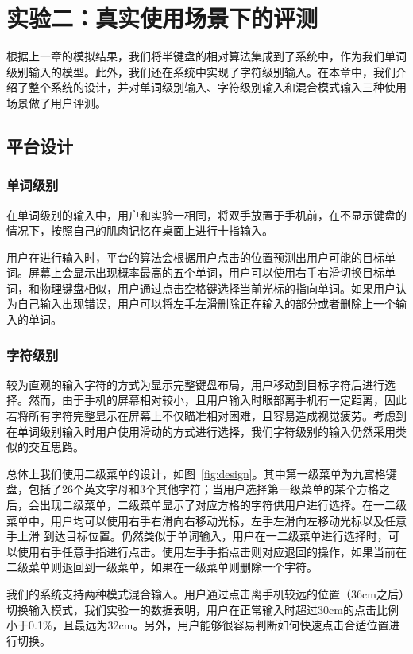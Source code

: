 \chapter{实验二：真实使用场景下的评测} %
\label{cha:evaluation}
根据上一章的模拟结果，我们将半键盘的相对算法集成到了系统中，作为我们单词级别输入的模型。此外，我们还在系统中实现了字符级别输入。在本章中，我们介绍了整个系统的设计，并对单词级别输入、字符级别输入和混合模式输入三种使用场景做了用户评测。

\section{平台设计}
\subsection{单词级别}
在单词级别的输入中，用户和实验一相同，将双手放置于手机前，在不显示键盘的情况下，按照自己的肌肉记忆在桌面上进行十指输入。

用户在进行输入时，平台的算法会根据用户点击的位置预测出用户可能的目标单词。屏幕上会显示出现概率最高的五个单词，用户可以使用右手右滑切换目标单词，和物理键盘相似，用户通过点击空格键选择当前光标的指向单词。如果用户认为自己输入出现错误，用户可以将左手左滑删除正在输入的部分或者删除上一个输入的单词。

\subsection{字符级别}
较为直观的输入字符的方式为显示完整键盘布局，用户移动到目标字符后进行选择。然而，由于手机的屏幕相对较小，且用户输入时眼部离手机有一定距离，因此若将所有字符完整显示在屏幕上不仅瞄准相对困难，且容易造成视觉疲劳。考虑到在单词级别输入时用户使用滑动的方式进行选择，我们字符级别的输入仍然采用类似的交互思路。

总体上我们使用二级菜单的设计，如图~\ref{fig:design}。其中第一级菜单为九宫格键盘，包括了26个英文字母和3个其他字符；当用户选择第一级菜单的某个方格之后，会出现二级菜单，二级菜单显示了对应方格的字符供用户进行选择。在一二级菜单中，用户均可以使用右手右滑向右移动光标，左手左滑向左移动光标以及任意手上滑 到达目标位置。仍然类似于单词输入，用户在一二级菜单进行选择时，可以使用右手任意手指进行点击。使用左手手指点击则对应退回的操作，如果当前在二级菜单则退回到一级菜单，如果在一级菜单则删除一个字符。

我们的系统支持两种模式混合输入。用户通过点击离手机较远的位置（36cm之后）切换输入模式，我们实验一的数据表明，用户在正常输入时超过30cm的点击比例小于0.1\%，且最远为32cm。另外，用户能够很容易判断如何快速点击合适位置进行切换。

